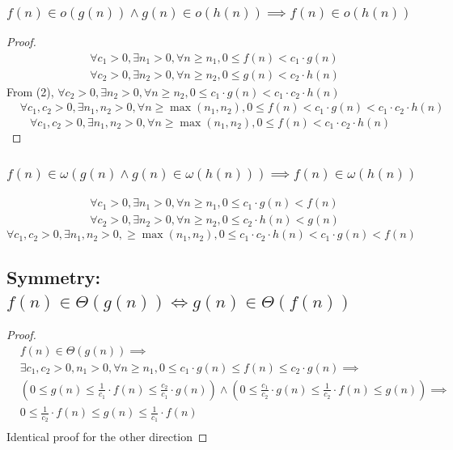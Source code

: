 \documentclass[9pt]{extarticle}
\begin{document}
\subsubsection{$f(n) \in o(g(n)) \land g(n) \in o(h(n)) \implies f(n) \in o(h(n))$}
\begin{proof}
    \begin{align}
        &\forall c_1 > 0, \exists n_1 > 0, \forall n \geq n_1, 0 \leq f(n) < c_1 \cdot g(n)\\
        &\forall c_2 > 0, \exists n_2 > 0, \forall n \geq n_2, 0 \leq g(n) < c_2 \cdot h(n)
    \end{align}
From  (2), $\forall c_2 > 0, \exists n_2 > 0, \forall n \geq n_2, 0 \leq c_1 \cdot g(n) < c_1 \cdot c_2 \cdot h(n)$
    \begin{align*}
        &\forall c_1, c_2 > 0, \exists n_1, n_2 > 0, \forall n \geq \max(n_1, n_2), 0 \leq f(n) < c_1 \cdot g(n) < c_1 \cdot c_2 \cdot h(n)
    \end{align*}
    \[\forall c_1, c_2 > 0, \exists n_1, n_2 > 0, \forall n \geq \max(n_1, n_2), 0 \leq f(n) < c_1 \cdot c_2 \cdot h(n)\]
\end{proof}

\subsubsection{$f(n) \in \omega(g(n) \land g(n) \in \omega(h(n))) \implies f(n) \in \omega(h(n))$}
    \begin{align*}
        &\forall c_1 > 0, \exists n_1 > 0, \forall n \geq n_1, 0 \leq c_1 \cdot g(n) < f(n)\\
        &\forall c_2 > 0, \exists n_2 > 0, \forall n \geq n_2, 0 \leq c_2 \cdot h(n) < g(n)
    \end{align*}
    \[\forall c_1, c_2 > 0, \exists n_1, n_2 > 0, \geq \max(n_1, n_2), 0 \leq c_1 \cdot c_2 \cdot h(n) < c_1 \cdot g(n) < f(n)\]
\subsection{Symmetry: $f(n) \in \Theta(g(n)) \iff g(n)\in \Theta(f(n))$}
\begin{proof}
    \begin{align*}
        & f(n) \in \Theta(g(n)) \implies\\
        &\exists c_1, c_2> 0, n_1 > 0, \forall n \geq n_1, 0 \leq c_1 \cdot g(n) \leq f(n) \leq c_2 \cdot g(n) \implies\\
        & \left(0 \leq g(n) \leq \frac{1}{c_1}\cdot f(n) \leq \frac{c_2}{c_1}\cdot g(n)\right) \land \left( 0 \leq \frac{c_1}{c_2} \cdot g(n) \leq \frac{1}{c_2} \cdot f(n) \leq g(n)\right) \implies \\
        & 0 \leq \frac{1}{c_2} \cdot f(n) \leq g(n) \leq \frac{1}{c_1}\cdot f(n)\\
    \end{align*}
    Identical proof for the other direction
\end{proof}
\end{document}
